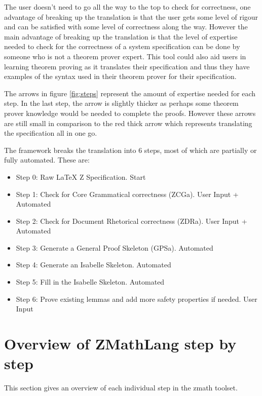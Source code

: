 The user doesn't need to go all the way to the top to check for correctness, one
advantage of breaking up the translation is that the user gets some level of
rigour and can be satisfied with some level of correctness along the way.
However the main advantage of breaking up the translation is that the level of
expertise needed to check for the correctness of a system specification can be
done by someone who is not a theorem prover expert. This tool could also aid
users in learning theorem proving as it translates their specification and thus
they have examples of the syntax used in their theorem prover for their
specification. 

The arrows in figure \ref{fig:steps} represent the amount of expertise needed
for each step. In the last step, the arrow is slightly thicker as perhaps some
theorem prover knowledge would be needed to complete the proofs. However these
arrows are still small in comparison to the red thick arrow which represents
translating the specification all in one go.

The framework breaks the translation into 6 steps, most of which are partially
or fully automated. These are:

\begin{itemize}
\item Step 0: Raw LaTeX Z Specification. {\color{set}Start}
\item Step 1: Check for Core Grammatical correctness (ZCGa). {\color{set}User Input + Automated}
\item Step 2: Check for Document Rhetorical correctness (ZDRa). {\color{set}User Input + Automated}
\item Step 3: Generate a General Proof Skeleton (GPSa). {\color{set}Automated}
\item Step 4: Generate an Isabelle Skeleton. {\color{set}Automated}
\item Step 5: Fill in the Isabelle Skeleton. {\color{set}Automated}
\item Step 6: Prove existing lemmas and add more safety properties if needed. {\color{set}User Input}
\end{itemize}


\section{Overview of ZMathLang step by step}

This section gives an overview of each individual step in the \gls{zmath}
toolset.

